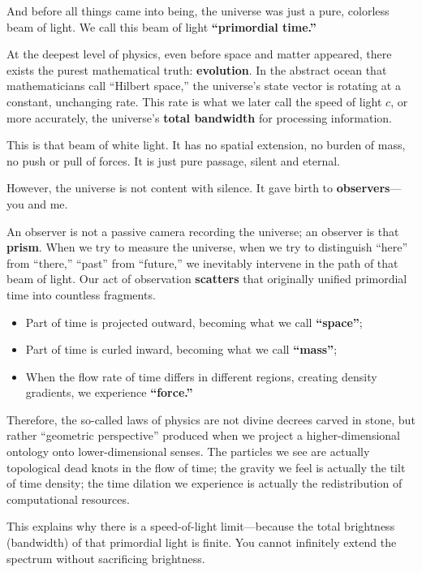 And before all things came into being, the universe was just a pure, colorless beam of light. We call this beam of light \textbf{``primordial time.''}

At the deepest level of physics, even before space and matter appeared, there exists the purest mathematical truth: \textbf{evolution}. In the abstract ocean that mathematicians call ``Hilbert space,'' the universe's state vector is rotating at a constant, unchanging rate. This rate is what we later call the speed of light $c$, or more accurately, the universe's \textbf{total bandwidth} for processing information.

This is that beam of white light. It has no spatial extension, no burden of mass, no push or pull of forces. It is just pure passage, silent and eternal.

However, the universe is not content with silence. It gave birth to \textbf{observers}---you and me.

An observer is not a passive camera recording the universe; an observer is that \textbf{prism}. When we try to measure the universe, when we try to distinguish ``here'' from ``there,'' ``past'' from ``future,'' we inevitably intervene in the path of that beam of light. Our act of observation \textbf{scatters} that originally unified primordial time into countless fragments.

\begin{itemize}
\item Part of time is projected outward, becoming what we call \textbf{``space''};

\item Part of time is curled inward, becoming what we call \textbf{``mass''};

\item When the flow rate of time differs in different regions, creating density gradients, we experience \textbf{``force.''}
\end{itemize}

Therefore, the so-called laws of physics are not divine decrees carved in stone, but rather ``geometric perspective'' produced when we project a higher-dimensional ontology onto lower-dimensional senses. The particles we see are actually topological dead knots in the flow of time; the gravity we feel is actually the tilt of time density; the time dilation we experience is actually the redistribution of computational resources.

This explains why there is a speed-of-light limit---because the total brightness (bandwidth) of that primordial light is finite. You cannot infinitely extend the spectrum without sacrificing brightness.

